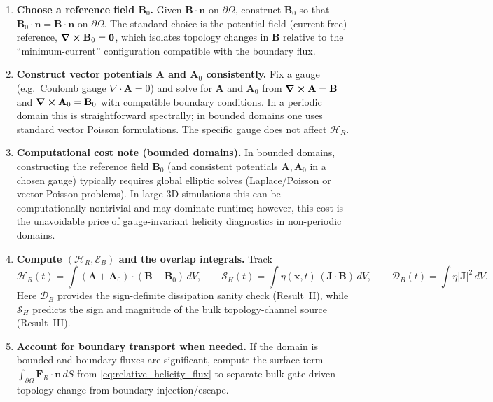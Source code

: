 \documentclass[11pt]{article}
\theoremstyle{plain}
\theoremstyle{definition}
\theoremstyle{remark}
\newcommand{\diver}{\nabla\cdot}
\newcommand{\A}{\mathbf{A}}
\newcommand{\B}{\mathbf{B}}
\newcommand{\J}{\mathbf{J}}
\begin{document}
\begin{enumerate}[leftmargin=*]
  \item \textbf{Choose a reference field $\B_0$.}
  Given $\B\cdot\mathbf{n}$ on $\partial\Omega$, construct $\B_0$ so that
  $\B_0\cdot\mathbf{n}=\B\cdot\mathbf{n}$ on $\partial\Omega$. The standard choice is the potential
  field (current-free) reference, $\curl\B_0=\mathbf{0}$, which isolates topology changes in $\B$
  relative to the ``minimum-current'' configuration compatible with the boundary flux.

  \item \textbf{Construct vector potentials $\A$ and $\A_0$ consistently.}
  Fix a gauge (e.g.\ Coulomb gauge $\diver\A=0$) and solve for $\A$ and $\A_0$ from
  $\curl\A=\B$ and $\curl\A_0=\B_0$ with compatible boundary conditions. In a periodic domain this is
  straightforward spectrally; in bounded domains one uses standard vector Poisson formulations.
  The specific gauge does not affect $\mathcal{H}_R$.

  \item \textbf{Computational cost note (bounded domains).}
  In bounded domains, constructing the reference field $\B_0$ (and consistent potentials $\A,\A_0$ in a chosen gauge) typically requires global elliptic solves (Laplace/Poisson or vector Poisson problems). In large 3D simulations this can be computationally nontrivial and may dominate runtime; however, this cost is the unavoidable price of gauge-invariant helicity diagnostics in non-periodic domains.

  \item \textbf{Compute $(\mathcal{H}_R, \mathcal{E}_B)$ and the overlap integrals.}
  Track
  \[
    \mathcal{H}_R(t)=\int (\A+\A_0)\cdot(\B-\B_0)\,dV,
    \qquad
    \mathcal{S}_H(t)=\int \eta(\mathbf{x},t)\,(\J\cdot\B)\,dV,
    \qquad
    \mathcal{D}_B(t)=\int \eta|\J|^2\,dV.
  \]
  Here $\mathcal{D}_B$ provides the sign-definite dissipation sanity check (Result~II), while
  $\mathcal{S}_H$ predicts the sign and magnitude of the bulk topology-channel source (Result~III).

  \item \textbf{Account for boundary transport when needed.}
  If the domain is bounded and boundary fluxes are significant, compute the surface term
  $\int_{\partial\Omega}\mathbf{F}_R\cdot\mathbf{n}\,dS$ from \eqref{eq:relative_helicity_flux} to separate
  bulk gate-driven topology change from boundary injection/escape.
\end{enumerate}
\end{document}
